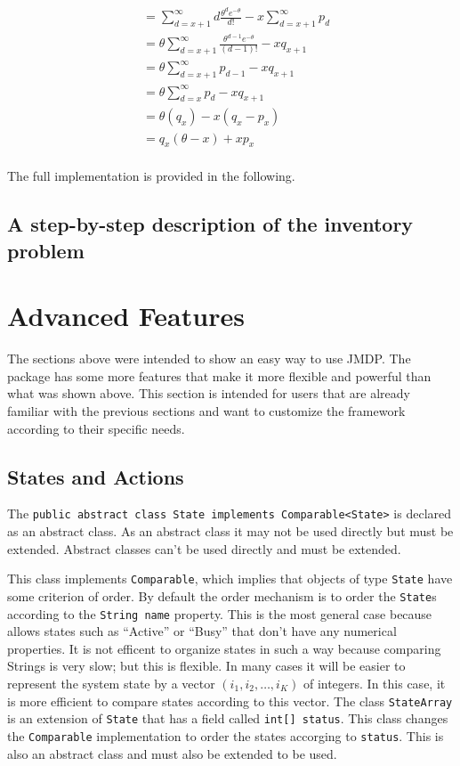\documentclass[11pt]{article}
\newcommand{\lstinclude}[1]{
	
}
\begin{document}
\begin{enumerate}
\begin{align*}
      &= \sum_{d=x+1}^\infty d\frac{\theta^d e^{-\theta}}{d!} -x\sum_{d=x+1}^\infty p_d \\
      &= \theta\sum_{d=x+1}^\infty \frac{\theta^{d-1} e^{-\theta}}{(d-1)!} -xq_{x+1} \\
      &= \theta\sum_{d=x+1}^\infty {p_{d-1}} -xq_{x+1} \\
      &= \theta\sum_{d=x}^\infty {p_{d}} -xq_{x+1} \\
      &= \theta (q_{x}) -x(q_{x}-p_x) \\
      &= q_x(\theta-x) +xp_x \\
    \end{align*}
\end{enumerate}


The full implementation is provided in the following.

\lstinclude{InfStochasticDemand.java}


\subsection{A step-by-step description of the inventory problem}



\section{Advanced Features}

The sections above were intended to show an easy way to use JMDP. The package has some more features that make it more flexible and powerful than what was shown above. This section is intended for users that are already familiar with the previous sections and want to customize the framework according to their specific needs.

\subsection{States and Actions}
The \lstinline!public abstract class State implements Comparable<State>! is declared as an abstract class. As an abstract class it may not be used directly but must be extended. Abstract classes can't be used directly and must be extended.

This class implements \lstinline!Comparable!, which implies that objects of type \lstinline!State! have some criterion of order. By default the order mechanism is to order the \lstinline!State!s according to the \lstinline!String name! property. This is the most general case because allows states such as "`Active"' or "`Busy"' that don't have any numerical properties. It is not efficent to organize states in such a way because comparing Strings is very slow; but this is flexible. In many cases it will be easier to represent the system state by a vector $(i_1,i_2,\ldots, i_K)$ of integers. In this case, it is more efficient to compare states according to this vector. The class \lstinline!StateArray! is an extension of \lstinline!State! that has a field called \lstinline!int[] status!. This class changes the \lstinline!Comparable! implementation to order the states accorging to \lstinline!status!. This is also an abstract class and must also be extended to be used.
\end{document}
